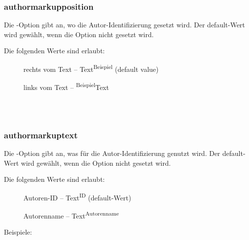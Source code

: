 \subsubsection{authormarkupposition}

Die -Option gibt an, wo die Autor-Identifizierung gesetzt wird.
Der default-Wert wird gewählt, wenn die Option nicht gesetzt wird.

Die folgenden Werte sind erlaubt:
\begin{description}
	\item [] rechts vom Text -- Text\textsuperscript{Beispiel} (default value)
	\item [] links vom Text -- \textsuperscript{Beispiel}Text
\end{description}

\begin{chusage}
		\>\\
	\usageexample
		\> \Corresponds\ \\
		\>
\end{chusage}

\subsubsection{authormarkuptext}

Die -Option gibt an, was für die Autor-Identifizierung genutzt wird.
Der default-Wert wird gewählt, wenn die Option nicht gesetzt wird.

Die folgenden Werte sind erlaubt:
\begin{description}
	\item [] Autoren-ID -- Text\textsuperscript{ID} (default-Wert)
	\item [] Autorenname -- Text\textsuperscript{Autorenname}
\end{description}

Beispiele:

\begin{chusage}
		\>\\
	\usageexample
		\> \Corresponds\ \\
		\>
\end{chusage}

